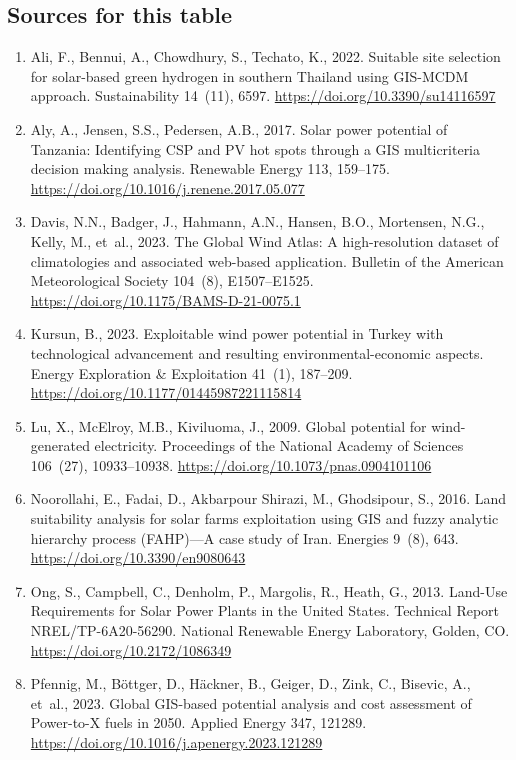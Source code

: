 \subsection*{Sources for this table}
\begin{enumerate}\setlength{\itemsep}{0pt}
\item Ali, F., Bennui, A., Chowdhury, S., Techato, K., 2022. Suitable site selection for solar-based green hydrogen in southern Thailand using GIS-MCDM approach. Sustainability 14~(11), 6597. \url{https://doi.org/10.3390/su14116597}
\item Aly, A., Jensen, S.S., Pedersen, A.B., 2017. Solar power potential of Tanzania: Identifying CSP and PV hot spots through a GIS multicriteria decision making analysis. Renewable Energy 113, 159--175. \url{https://doi.org/10.1016/j.renene.2017.05.077}
\item Davis, N.N., Badger, J., Hahmann, A.N., Hansen, B.O., Mortensen, N.G., Kelly, M., et~al., 2023. The Global Wind Atlas: A high-resolution dataset of climatologies and associated web-based application. Bulletin of the American Meteorological Society 104~(8), E1507--E1525. \url{https://doi.org/10.1175/BAMS-D-21-0075.1}
\item Kursun, B., 2023. Exploitable wind power potential in Turkey with technological advancement and resulting environmental-economic aspects. Energy Exploration \& Exploitation 41~(1), 187--209. \url{https://doi.org/10.1177/01445987221115814}
\item Lu, X., McElroy, M.B., Kiviluoma, J., 2009. Global potential for wind-generated electricity. Proceedings of the National Academy of Sciences 106~(27), 10933--10938. \url{https://doi.org/10.1073/pnas.0904101106}
\item Noorollahi, E., Fadai, D., Akbarpour Shirazi, M., Ghodsipour, S., 2016. Land suitability analysis for solar farms exploitation using GIS and fuzzy analytic hierarchy process (FAHP)---A case study of Iran. Energies 9~(8), 643. \url{https://doi.org/10.3390/en9080643}
\item Ong, S., Campbell, C., Denholm, P., Margolis, R., Heath, G., 2013. Land-Use Requirements for Solar Power Plants in the United States. Technical Report NREL/TP-6A20-56290. National Renewable Energy Laboratory, Golden, CO. \url{https://doi.org/10.2172/1086349}
\item Pfennig, M., B{\"o}ttger, D., H{\"a}ckner, B., Geiger, D., Zink, C., Bisevic, A., et~al., 2023. Global GIS-based potential analysis and cost assessment of Power-to-X fuels in 2050. Applied Energy 347, 121289. \url{https://doi.org/10.1016/j.apenergy.2023.121289}

\end{enumerate}
